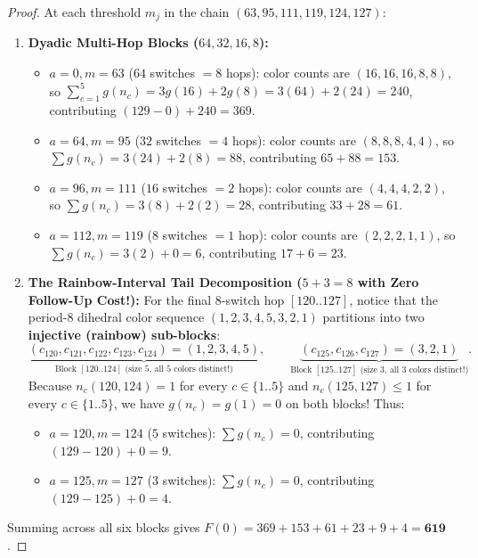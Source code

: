 \documentclass[11pt,a4paper]{article}
\theoremstyle{definition}
\theoremstyle{remark}
\begin{document}
\begin{proof}
At each threshold $m_j$ in the chain $(63, 95, 111, 119, 124, 127)$:
\begin{enumerate}[leftmargin=1.6em]
    \item \textbf{Dyadic Multi-Hop Blocks ($64, 32, 16, 8$):}
    \begin{itemize}
        \item $a=0, m=63$ ($64$ switches $= 8$ hops): color counts are $(16, 16, 16, 8, 8)$, so $\sum_{c=1}^5 g(n_c) = 3 g(16) + 2 g(8) = 3(64) + 2(24) = 240$, contributing $(129 - 0) + 240 = 369$.
        \item $a=64, m=95$ ($32$ switches $= 4$ hops): color counts are $(8, 8, 8, 4, 4)$, so $\sum g(n_c) = 3(24) + 2(8) = 88$, contributing $65 + 88 = 153$.
        \item $a=96, m=111$ ($16$ switches $= 2$ hops): color counts are $(4, 4, 4, 2, 2)$, so $\sum g(n_c) = 3(8) + 2(2) = 28$, contributing $33 + 28 = 61$.
        \item $a=112, m=119$ ($8$ switches $= 1$ hop): color counts are $(2, 2, 2, 1, 1)$, so $\sum g(n_c) = 3(2) + 0 = 6$, contributing $17 + 6 = 23$.
    \end{itemize}
    \item \textbf{The Rainbow-Interval Tail Decomposition ($5 + 3 = 8$ with Zero Follow-Up Cost!):}
    For the final 8-switch hop $[120..127]$, notice that the period-8 dihedral color sequence $(1, 2, 3, 4, 5, 3, 2, 1)$ partitions into two \textbf{injective (rainbow) sub-blocks}:
    \begin{equation}
        \underbrace{(c_{120}, c_{121}, c_{122}, c_{123}, c_{124}) = (1, 2, 3, 4, 5)}_{\text{Block } [120..124] \text{ (size 5, all 5 colors distinct!)}}, \qquad
        \underbrace{(c_{125}, c_{126}, c_{127}) = (3, 2, 1)}_{\text{Block } [125..127] \text{ (size 3, all 3 colors distinct!)}}.
    \end{equation}
    Because $n_c(120, 124) = 1$ for every $c \in \{1..5\}$ and $n_c(125, 127) \le 1$ for every $c \in \{1..5\}$, we have $g(n_c) = g(1) = 0$ on both blocks! Thus:
    \begin{itemize}
        \item $a=120, m=124$ ($5$ switches): $\sum g(n_c) = 0$, contributing $(129 - 120) + 0 = 9$.
        \item $a=125, m=127$ ($3$ switches): $\sum g(n_c) = 0$, contributing $(129 - 125) + 0 = 4$.
    \end{itemize}
\end{enumerate}
Summing across all six blocks gives $F(0) = 369 + 153 + 61 + 23 + 9 + 4 = \mathbf{619}$.
\end{proof}
\end{document}
